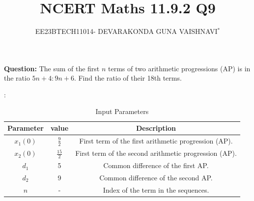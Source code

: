 \documentclass[a4,12pt,onecolumn]{IEEEtran}
\title{
	
	\title{NCERT Maths 11.9.2 Q9}
	\author{EE23BTECH11014- DEVARAKONDA GUNA VAISHNAVI$^{*}$%
	}
	
	
}
\begin{document}
\maketitle
	
\textbf{Question:} 
The sum of the first $n$ terms of two arithmetic progressions (AP) is in the ratio $5n+4 : 9n+6$. Find the ratio of their 18th terms.

\solution:
\begin{table}[htbp]
	\centering
    \begin{tabular}{|c|c|c|}
    \hline
    \textbf{Parameter} &\textbf{value}& \textbf{Description} \\
    \hline
    \( x_1(0) \) & $\frac{9}{2}$& First term of the first arithmetic progression (AP). \\
    \hline
    \( x_2(0) \) &$\frac{15}{2}$& First term of the second arithmetic progression (AP).  \\
    \hline
    \( d_1 \) & 5 &Common difference of the first AP. \\
    \hline
    \( d_2 \) & 9&Common difference of the second AP. \\
    \hline
    \( n \) & - &Index of the term in the sequences. \\
    \hline
    \end{tabular}
    \label{tab:parameters}
     \caption{Input Parameters}
\end{table}
\end{document}
